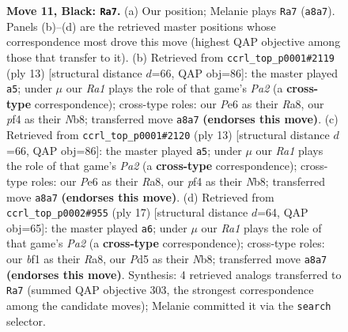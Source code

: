 \documentclass[11pt]{article}
\begin{document}
\begin{figure}[p]
\caption{\textbf{Move 11, Black: \texttt{Ra7}.} (a) Our position; Melanie plays \texttt{Ra7} (\texttt{a8a7}). Panels (b)--(d) are the retrieved master positions whose correspondence most drove this move (highest QAP objective among those that transfer to it). (b) Retrieved from \texttt{ccrl\_top\_p0001\#2119} (ply 13) [structural distance $d$=66, QAP obj=86]: the master played \texttt{a5}; under $\mu$ our \emph{Ra1} plays the role of that game's \emph{Pa2} (a \textbf{cross-type} correspondence); cross-type roles: our \emph{P}e6 as their \emph{R}a8, our \emph{p}f4 as their \emph{N}b8; transferred move \texttt{a8a7} \textbf{(endorses this move)}. (c) Retrieved from \texttt{ccrl\_top\_p0001\#2120} (ply 13) [structural distance $d$=66, QAP obj=86]: the master played \texttt{a5}; under $\mu$ our \emph{Ra1} plays the role of that game's \emph{Pa2} (a \textbf{cross-type} correspondence); cross-type roles: our \emph{P}e6 as their \emph{R}a8, our \emph{p}f4 as their \emph{N}b8; transferred move \texttt{a8a7} \textbf{(endorses this move)}. (d) Retrieved from \texttt{ccrl\_top\_p0002\#955} (ply 17) [structural distance $d$=64, QAP obj=65]: the master played \texttt{a6}; under $\mu$ our \emph{Ra1} plays the role of that game's \emph{Pa2} (a \textbf{cross-type} correspondence); cross-type roles: our \emph{b}f1 as their \emph{R}a8, our \emph{P}d5 as their \emph{N}b8; transferred move \texttt{a8a7} \textbf{(endorses this move)}. Synthesis: 4 retrieved analogs transferred to \texttt{Ra7} (summed QAP objective 303, the strongest correspondence among the candidate moves); Melanie committed it via the \texttt{search} selector.}
\label{fig:thought-m21}
\end{figure}

\clearpage
\end{document}
